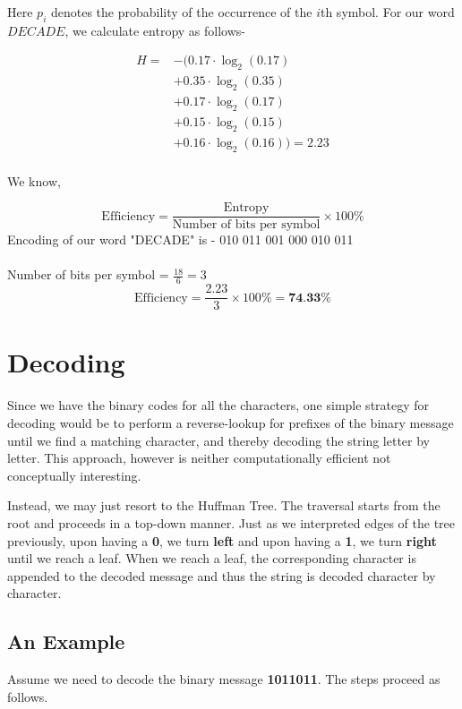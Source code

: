 \documentclass[18pt]{article}
\begin{document}
Here $p_i$ denotes the probability of the occurrence of the $i$th symbol. For our word $DECADE$, we calculate entropy as follows-

\begin{align*}
	H = & - (0.17 \cdot \log_2(0.17) \\
	& + 0.35 \cdot \log_2(0.35) \\
	& + 0.17 \cdot \log_2(0.17) \\
	& + 0.15 \cdot \log_2(0.15) \\
	& + 0.16 \cdot \log_2(0.16)) = 2.23 \\
\end{align*}

We know, 

\[
\text{Efficiency} = \frac{\text{Entropy}}{\text{Number of bits per symbol}} \times 100 \%
\]
$$$$
Encoding of our word "DECADE" is - 010 011 001 000 010 011
\\\\
Number of bits per symbol = $\frac{18}{6} = 3$
$$$$
\[
\text{Efficiency} = \frac{2.23}{3}\times 100\% = \textbf{74.33\%}
\]


\newpage

\section{Decoding}

Since we have the binary codes for all the characters, one simple strategy for decoding would be to perform a reverse-lookup for prefixes of the binary message until we find a matching character, and thereby decoding the string letter by letter. This approach, however is neither computationally efficient not conceptually interesting.

Instead, we may just resort to the Huffman Tree. The traversal starts from the root and proceeds in a top-down manner. Just as we interpreted edges of the tree previously, upon having a \textbf{0}, we turn \textbf{left} and upon having a \textbf{1}, we turn \textbf{right} until we reach a leaf. When we reach a leaf, the corresponding character is appended to the decoded message and thus the string is decoded character by character.


\subsection{An Example}

Assume we need to decode the binary message \textbf{1011011}. The steps proceed as follows.
\end{document}

